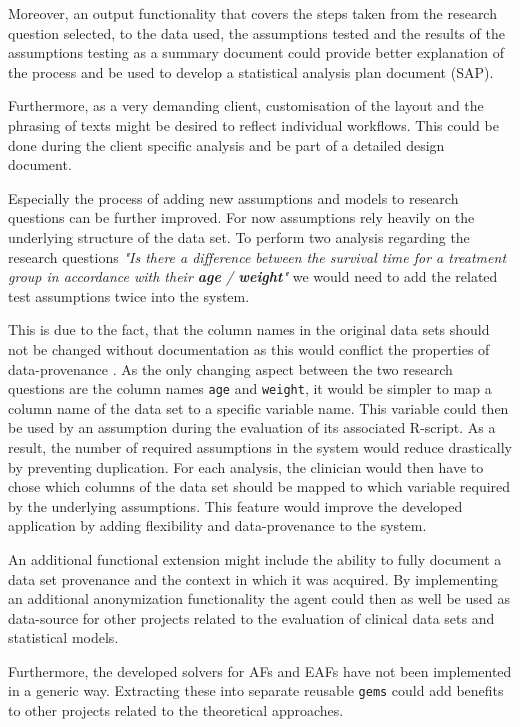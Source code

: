 Moreover, an output functionality that covers the steps taken from the research question selected, to the data used, the assumptions tested and the results of the assumptions testing as a summary document could provide better explanation of the process and be used to develop a statistical analysis plan document (SAP).

Furthermore, as a very demanding client, customisation of the layout and the phrasing of texts might be desired to reflect individual workflows. This could be done during the client specific analysis and be part of a detailed design document.


Especially the process of adding new assumptions and models to research questions can be further improved. For now assumptions rely heavily on the underlying structure of the data set. To perform two analysis regarding the research questions \textit{"Is there a difference between the survival time for a treatment group in accordance with their \textbf{age} / \textbf{weight}"} we would need to add the related test assumptions twice into the system. 

This is due to the fact, that the column names in the original data sets should not be changed without documentation as this would conflict the properties of data-provenance \cite{provenance}. As the only changing aspect between the two research questions are the column names \texttt{age} and \texttt{weight}, it would be simpler to map a column name of the data set to a specific variable name. This variable could then be used by an assumption during the evaluation of its associated \gls{R}-script. As a result, the number of required assumptions in the system would reduce drastically by preventing duplication. For each analysis, the clinician would then have to chose which columns of the data set should be mapped to which variable required by the underlying assumptions. This feature would improve the developed application by adding flexibility and data-provenance to the system.

An additional functional extension might include the ability to fully document a data set provenance and the context in which it was acquired. By implementing an additional anonymization functionality the agent could then as well be used as data-source for other projects related to the evaluation of clinical data sets and statistical models.

Furthermore, the developed solvers for \glspl{AF} and \glspl{EAF} have not been implemented in a generic way. Extracting these into separate reusable \texttt{gems} could add benefits to other projects related to the theoretical approaches.
